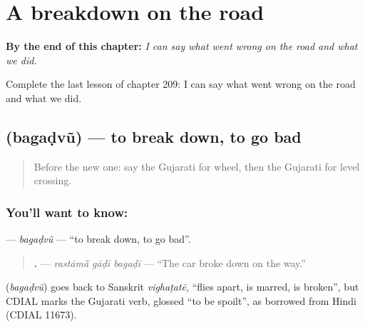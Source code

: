 
\chapter{A breakdown on the road}
\label{ch:gu-a-breakdown-on-the-road}

\begin{chapteropening}
\textbf{By the end of this chapter:} \emph{I can say what went wrong on the road and what we did.}

Complete the last lesson of chapter 209: I can say what went wrong on the road and what we did.
\end{chapteropening}

\section[\texorpdfstring{\gu{બગડવું} (bagaḍvũ)}{બગડવું (bagaḍvũ)}]{ (bagaḍvũ) — to break down, to go bad}

\label{lesson:GU-C209-bagadvu}



\begin{quote}
Before the new one: say the Gujarati for wheel, then the Gujarati for level crossing.
\end{quote}

\subsection*{You'll want to know: }
\textbf{} — \emph{bagaḍvũ} — \textquotedblleft{}to break down, to go bad\textquotedblright{}.

\begin{quote}
\textbf{  .} — \emph{rastāmā̃ gāḍī bagaḍī} — \textquotedblleft{}The car broke down on the way.\textquotedblright{}
\end{quote}

\begin{cousinweb}
\textbf{} (\emph{bagaḍvũ}) goes back to Sanskrit \emph{vighaṭatē}, \textquotedblleft{}flies apart, is marred, is broken\textquotedblright{}, but CDIAL marks the Gujarati verb, glossed \textquotedblleft{}to be spoilt\textquotedblright{}, as borrowed from Hindi (CDIAL 11673).
\end{cousinweb}

